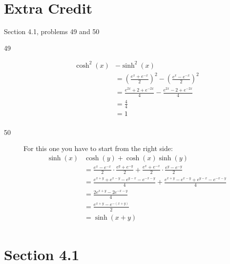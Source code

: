 \documentclass{exam}
\begin{document}
  \section{Extra Credit}
  Section 4.1, problems 49 and 50

  \ifprintanswers
    \begin{description}
      \item[49]
        \begin{align*}
          \cosh^2(x) &- \sinh^2(x) \\
                     &= \left( \frac{e^x + e^{-x}}{2} \right)^2 - \left( \frac{e^x - e^{-x}}{2} \right)^2 \\
                     &= \frac{e^{2x} + 2 + e^{-2x}}{4} - \frac{e^{2x} - 2 + e^{-2x}}{4} \\
                     &= \frac{4}{4} \\
                     &= 1 \\
        \end{align*}

      \item[50]
        For this one you have to start from the right side:
        \begin{align*}
          \sinh(x) & \cosh(y) + \cosh(x) \sinh(y) \\
                            &= \frac{e^x - e^{-x}}{2} \cdot \frac{e^y + e^{-y}}{2} 
                                 + \frac{e^x + e^{-x}}{2} \cdot \frac{e^y - e^{-y}}{2} \\
                            &= \frac{e^{x + y} + e^{x - y} - e^{y - x} - e^{-x - y}}{4} 
                                + \frac{e^{x + y} - e^{x - y} + e^{y - x} - e^{-x - y}}{4} \\
                            &= \frac{2e^{x + y} - 2e^{-x - y}}{4} \\
                            &= \frac{e^{x + y} - e^{-(x + y)}}{2} \\
                            &= \sinh(x + y) \\
        \end{align*}
        
    \end{description}


    \section{Section 4.1}
\end{document}
